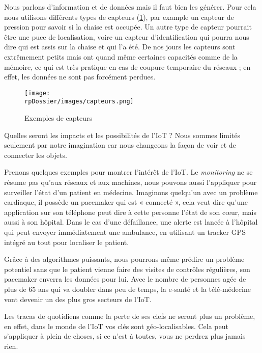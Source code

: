 Nous parlons d'information et de données mais il faut bien les générer. Pour cela nous utilisons différents types de capteurs (\cref{sensors}), par example un capteur de pression pour savoir si la chaise est occupée. Un autre type de capteur pourrait être une puce de localisation, voire un capteur d'identification qui pourra nous dire qui est assis sur la chaise et qui l'a été. De nos jours les capteurs sont extrêmement petits mais ont quand même certaines capacités comme de la mémoire, ce qui est très pratique en cas de coupure temporaire du réseaux ; en effet, les données ne sont pas forcément perdues.

\begin{figure}[H]
\centering
\texttt{[image: \\rpDossier/images/capteurs.png]}
\caption{Exemples de capteurs}
\label{sensors}
\end{figure}

Quelles seront les impacts et les possibilités de l'IoT ? Nous sommes limités seulement par notre imagination car nous changeons la façon de voir et de connecter les objets.


Prenons quelques exemples pour montrer l'intérêt de l'IoT. Le \textit{monitoring} ne se résume pas qu’aux réseaux et aux machines, nous pouvons aussi l'appliquer pour surveiller l'état d'un patient en médecine. Imaginons quelqu'un avec un problème cardiaque, il possède un pacemaker qui est « connecté », cela veut dire qu'une application sur son téléphone peut dire à cette personne l'état de son cœur, mais aussi à son hôpital. Dans le cas d'une défaillance, une alerte est lancée à l'hôpital qui peut envoyer immédiatement une ambulance, en utilisant un tracker GPS intégré au tout pour localiser le patient.

Grâce à des algorithmes puissants, nous pourrons même prédire un problème potentiel sans que le patient vienne faire des visites de contrôles régulières, son pacemaker enverra les données pour lui. Avec le nombre de personnes agée de plus de 65 ans qui va doubler dans peu de temps, la e-santé et la télé-médecine vont devenir un des plus gros secteurs de l'IoT. 


Les tracas de quotidiens comme la perte de ses clefs ne seront plus un problème, en effet, dans le monde de l'IoT vos clés sont géo-localisables. Cela peut s'appliquer à plein de choses, si ce n'est à toutes, vous ne perdrez plus jamais rien.


